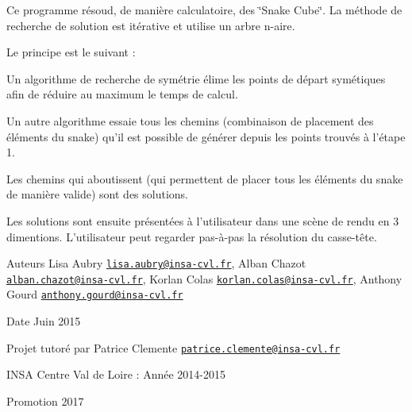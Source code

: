 Ce programme résoud, de manière calculatoire, des \char`\"{}\-Snake Cube\char`\"{}. La méthode de recherche de solution est itérative et utilise un arbre n-\/aire.

Le principe est le suivant \-:
\begin{DoxyEnumerate}
\item Un algorithme de recherche de symétrie élime les points de départ symétiques afin de réduire au maximum le temps de calcul.
\item Un autre algorithme essaie tous les chemins (combinaison de placement des éléments du snake) qu'il est possible de générer depuis les points trouvés à l'étape 1.
\item Les chemins qui aboutissent (qui permettent de placer tous les éléments du snake de manière valide) sont des solutions.
\item Les solutions sont ensuite présentées à l'utilisateur dans une scène de rendu en 3 dimentions. L'utilisateur peut regarder pas-\/à-\/pas la résolution du casse-\/tête.
\end{DoxyEnumerate}

\begin{DoxyAuthor}{Auteurs}
Lisa Aubry \href{mailto:lisa.aubry@insa-cvl.fr}{\tt lisa.\-aubry@insa-\/cvl.\-fr}, Alban Chazot \href{mailto:alban.chazot@insa-cvl.fr}{\tt alban.\-chazot@insa-\/cvl.\-fr}, Korlan Colas \href{mailto:korlan.colas@insa-cvl.fr}{\tt korlan.\-colas@insa-\/cvl.\-fr}, Anthony Gourd \href{mailto:anthony.gourd@insa-cvl.fr}{\tt anthony.\-gourd@insa-\/cvl.\-fr} 
\end{DoxyAuthor}
\begin{DoxyDate}{Date}
Juin 2015
\end{DoxyDate}
Projet tutoré par Patrice Clemente \href{mailto:patrice.clemente@insa-cvl.fr}{\tt patrice.\-clemente@insa-\/cvl.\-fr}

I\-N\-S\-A Centre Val de Loire \-: Année 2014-\/2015

Promotion 2017 